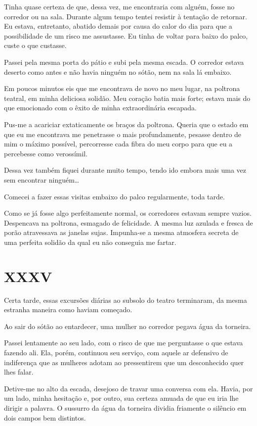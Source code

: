 Tinha quase certeza de que, dessa vez, me encontraria com alguém, fosse no corredor ou na sala. Durante algum tempo tentei resistir à tentação de retornar. Eu estava, entretanto, abatido demais por causa do calor do dia para que a possibilidade de um risco me assustasse. Eu tinha de voltar para baixo do palco, custe o que custasse.

Passei pela mesma porta do pátio e subi pela mesma escada. O corredor estava deserto como antes e não havia ninguém no sótão, nem na sala lá embaixo.

Em poucos minutos eis que me encontrava de novo no meu lugar, na poltrona teatral, em minha deliciosa solidão. Meu coração batia mais forte; estava mais do que emocionado com o êxito de minha extraordinária escapada.

Pus-me a acariciar extaticamente os braços da poltrona. Queria que o estado em que eu me encontrava me penetrasse o mais profundamente, pesasse dentro de mim o máximo possível, percorresse cada fibra do meu corpo para que eu a percebesse como verossímil.

Dessa vez também fiquei durante muito tempo, tendo ido embora mais uma vez sem encontrar ninguém…

Comecei a fazer essas visitas embaixo do palco regularmente, toda tarde.

Como se já fosse algo perfeitamente normal, os corredores estavam sempre vazios. Despencava na poltrona, esmagado de felicidade. A mesma luz azulada e fresca de porão atravessava as janelas sujas. Impunha-se a mesma atmosfera secreta de uma perfeita solidão da qual eu não conseguia me fartar.


\chapter*{\centering\Large{XXXV}}

Certa tarde, essas excursões diárias ao subsolo do teatro terminaram, da mesma estranha maneira como haviam começado.

Ao sair do sótão ao entardecer, uma mulher no corredor pegava água da torneira.

Passei lentamente ao seu lado, com o risco de que me perguntasse o que estava fazendo ali. Ela, porém, continuou seu serviço, com aquele ar defensivo de indiferença que as mulheres adotam ao pressentirem que um desconhecido quer lhes falar.

Detive-me no alto da escada, desejoso de travar uma conversa com ela. Havia, por um lado, minha hesitação e, por outro, sua certeza amuada de que eu iria lhe dirigir a palavra. O sussurro da água da torneira dividia friamente o silêncio em dois campos bem distintos.

